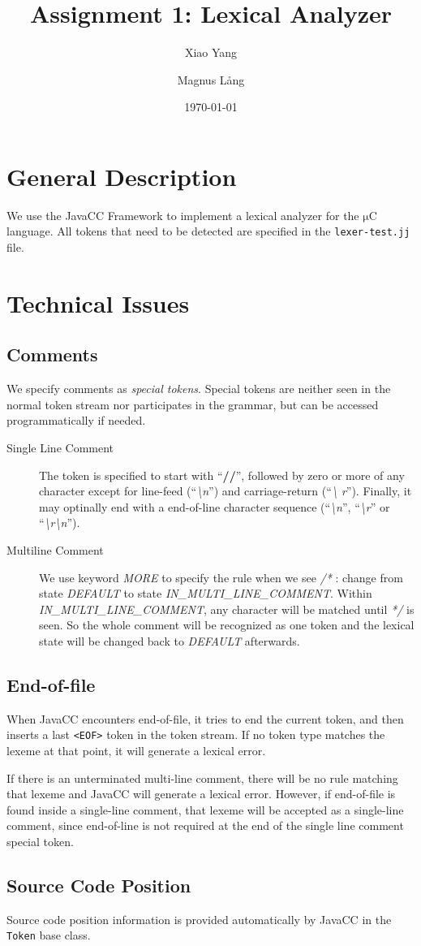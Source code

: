 \documentclass[a4paper,11pt]{article}
\title{Assignment 1: Lexical Analyzer}
\author{Xiao Yang \and Magnus L{\aa}ng} %
\date{\today}
\newcommand{\token}[1]{\texttt{<#1>}}
\newcommand{\uC}{{$\mathrm{\mu}$}C }
\begin{document}
\maketitle
\section{General Description}
We use the JavaCC Framework to implement a lexical analyzer for the \uC
language. All tokens that need to be detected are specified in the
\texttt{lexer-test.jj} file.

\section{Technical Issues}
\subsection{Comments}
We specify comments as \emph{special tokens}. Special tokens are neither seen in
the normal token stream nor participates in the grammar, but can be accessed
programmatically if needed.
\begin{description}
\item[Single Line Comment] The token is specified to start with ``\textbf{//}'',
  followed by zero or more of any character except for line-feed
  (``\textit{\textbackslash n}'') and carriage-return (``\textit{\textbackslash
    r}''). Finally, it may optinally end with a end-of-line character sequence
  (``\textit{\textbackslash n}'', ``\textit{\textbackslash r}'' or
  ``\textit{\textbackslash r\textbackslash n}'').
\item[Multiline Comment] We use keyword \emph{MORE} to specify the rule when we
  see \textit{/*} : change from state \emph{DEFAULT} to state
  \emph{IN\_MULTI\_LINE\_COMMENT}. Within \emph{IN\_MULTI\_LINE\_COMMENT}, any
  character will be matched until \textit{*/} is seen. So the whole comment will
  be recognized as one token and the lexical state will be changed back to
  \emph{DEFAULT} afterwards.

\end{description}
\subsection{End-of-file}
When JavaCC encounters end-of-file, it tries to end the current token, and then
inserts a last \token{EOF} token in the token stream. If no token type matches
the lexeme at that point, it will generate a lexical error.

If there is an unterminated multi-line comment, there will be no rule matching
that lexeme and JavaCC will generate a lexical error. However, if end-of-file is
found inside a single-line comment, that lexeme will be accepted as a
single-line comment, since end-of-line is not required at the end of the single
line comment special token.

\subsection{Source Code Position}
Source code position information is provided automatically by JavaCC in the
\texttt{Token} base class.
\end{document}
